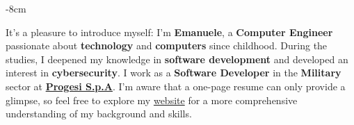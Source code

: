 \documentclass[10pt,a4paper]{altacv}
\begin{document}







\begin{adjustwidth}{}{-8cm}
\makecvheader
\end{adjustwidth}

It's a pleasure to introduce myself: I'm \textbf{Emanuele}, a \textbf{Computer Engineer} passionate about \textbf{technology} and \textbf{computers} since childhood. During the studies, I deepened my knowledge in \textbf{software development} and developed an interest in \textbf{cybersecurity}. I work as a \textbf{Software Developer} in the \textbf{Military} sector at \href{https://emanueleseminara.it/}{\textbf{Progesi S.p.A}}. I'm aware that a one-page resume can only provide a glimpse, so feel free to explore my \href{https://emanueleseminara.it/}{website} for a more comprehensive understanding of my background and skills.

\end{document}
